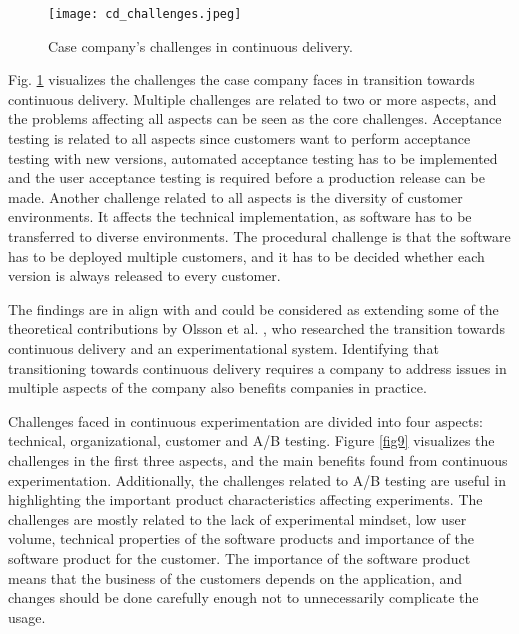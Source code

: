 \documentclass[english]{tktltiki2}
\theoremstyle{definition}
\theoremstyle{remark}
\begin{document}
\begin{figure}[!htb]
	\centering
	\texttt{[image: cd\_challenges.jpeg]}
	\caption{Case company's challenges in continuous delivery.}
	\label{fig8}
\end{figure}

Fig. \ref{fig8} visualizes the challenges the case company faces in transition towards continuous delivery. Multiple challenges are related to two or more aspects, and the problems affecting all aspects can be seen as the core challenges. Acceptance testing is related to all aspects since customers want to perform acceptance testing with new versions, automated acceptance testing has to be implemented and the user acceptance testing is required before a production release can be made. Another challenge related to all aspects is the diversity of customer environments. It affects the technical implementation, as software has to be transferred to diverse environments. The procedural challenge is that the software has to be deployed multiple customers, and it has to be decided whether each version is always released to every customer. 

The findings are in align with and could be considered as extending some of the theoretical contributions by Olsson et al. \cite{olsson2012climbing}, who researched the transition towards continuous delivery and an experimentational system. Identifying that transitioning towards continuous delivery requires a company to address issues in multiple aspects of the company also benefits companies in practice. 







Challenges faced in continuous experimentation are divided into four aspects: technical, organizational, customer and A/B testing. Figure \ref{fig9} visualizes the challenges in the first three aspects, and the main benefits found from continuous experimentation. Additionally, the challenges related to A/B testing are useful in highlighting the important product characteristics affecting experiments. The challenges are mostly related to the lack of experimental mindset, low user volume, technical properties of the software products and importance of the software product for the customer. The importance of the software product means that the business of the customers depends on the application, and changes should be done carefully enough not to unnecessarily complicate the usage. 
\end{document}
